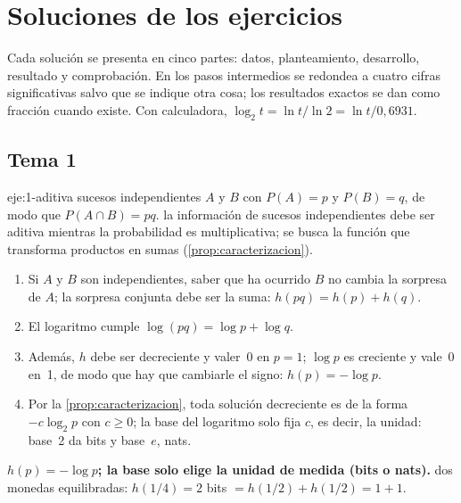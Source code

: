 \chapter{Soluciones de los ejercicios}
\label{ap:soluciones}

Cada solución se presenta en cinco partes: datos, planteamiento, desarrollo, resultado y comprobación. En los pasos intermedios se redondea a cuatro cifras significativas salvo que se indique otra cosa; los resultados exactos se dan como fracción cuando existe. Con calculadora, $\log_2 t=\ln t/\ln 2=\ln t/0{,}6931$.

\section{Tema 1}

\begin{solucion}{eje:1-aditiva}
\datos sucesos independientes $A$ y $B$ con $P(A)=p$ y $P(B)=q$, de modo que $P(A\cap B)=pq$.
\planteamiento la información de sucesos independientes debe ser aditiva mientras la probabilidad es multiplicativa; se busca la función que transforma productos en sumas (\cref{prop:caracterizacion}).
\pasos
\begin{enumerate}[label=\arabic*.]
  \item Si $A$ y $B$ son independientes, saber que ha ocurrido $B$ no cambia la sorpresa de $A$; la sorpresa conjunta debe ser la suma: $h(pq)=h(p)+h(q)$.
  \item El logaritmo cumple $\log(pq)=\log p+\log q$.
  \item Además, $h$ debe ser decreciente y valer~0 en $p=1$; $\log p$ es creciente y vale~0 en~1, de modo que hay que cambiarle el signo: $h(p)=-\log p$.
  \item Por la \cref{prop:caracterizacion}, toda solución decreciente es de la forma $-c\log_2p$ con $c\ge 0$; la base del logaritmo solo fija $c$, es decir, la unidad: base~2 da bits y base~$e$, nats.
\end{enumerate}
\resultado \textbf{$h(p)=-\log p$; la base solo elige la unidad de medida (bits o nats).}
\comprobacion dos monedas equilibradas: $h(1/4)=2$ bits $=h(1/2)+h(1/2)=1+1$.
\end{solucion}

